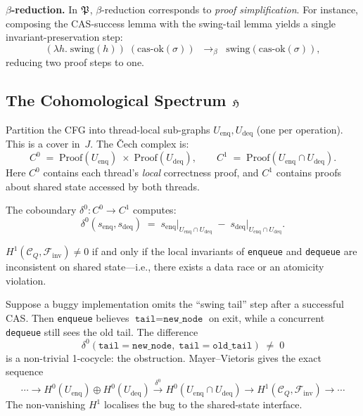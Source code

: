 \textbf{$\beta$-reduction.}\quad
In $\mathfrak{P}$, $\beta$-reduction corresponds to
\emph{proof simplification}.  For instance, composing the CAS-success
lemma with the swing-tail lemma yields a single invariant-preservation
step:
\[
  (\lambda h.\;\mathrm{swing}(h))\;(\mathrm{cas\text{-}ok}(\sigma))
  \;\;\longrightarrow_\beta\;\;
  \mathrm{swing}(\mathrm{cas\text{-}ok}(\sigma)),
\]
reducing two proof steps to one.

\subsection{The Cohomological Spectrum $\mathfrak{H}$}

\begin{construction}
\label{con:thread-cover}
Partition the CFG into thread-local sub-graphs
$U_{\mathrm{enq}},U_{\mathrm{deq}}$ (one per operation).  This is a
cover in~$J$.  The \v{C}ech complex is:
\[
  C^0 \;=\;
  \mathrm{Proof}(U_{\mathrm{enq}})
  \;\times\;
  \mathrm{Proof}(U_{\mathrm{deq}}),
  \qquad
  C^1 \;=\;
  \mathrm{Proof}(U_{\mathrm{enq}}\cap U_{\mathrm{deq}}).
\]
Here $C^0$ contains each thread's \emph{local} correctness proof,
and $C^1$ contains proofs about shared state accessed by both threads.
\end{construction}

The coboundary $\delta^0:C^0\to C^1$ computes:
\[
  \delta^0(s_{\mathrm{enq}},s_{\mathrm{deq}})
  \;=\;
  s_{\mathrm{enq}}\big|_{U_{\mathrm{enq}}\cap U_{\mathrm{deq}}}
  \;-\;
  s_{\mathrm{deq}}\big|_{U_{\mathrm{enq}}\cap U_{\mathrm{deq}}}.
\]

\begin{proposition}[Obstruction = data race]
\label{prop:race-obstruction}
$H^1(\mathcal{C}_Q,\mathcal{F}_{\mathrm{inv}})\neq 0$ if and only
if the local invariants of \texttt{enqueue} and \texttt{dequeue}
are inconsistent on shared state---i.e., there exists a data race
or an atomicity violation.
\end{proposition}

\begin{example}
Suppose a buggy implementation omits the ``swing tail'' step after
a successful CAS.  Then \texttt{enqueue} believes
$\texttt{tail}=\texttt{new\_node}$ on exit, while a concurrent
\texttt{dequeue} still sees the old tail.  The difference
\[
  \delta^0(\texttt{tail}=\texttt{new\_node},\;
           \texttt{tail}=\texttt{old\_tail})
  \;\neq\;0
\]
is a non-trivial 1-cocycle: the obstruction.
Mayer--Vietoris gives the exact sequence
\[
  \cdots\to
  H^0(U_{\mathrm{enq}})\oplus H^0(U_{\mathrm{deq}})
  \xrightarrow{\;\delta^0\;}
  H^0(U_{\mathrm{enq}}\cap U_{\mathrm{deq}})
  \to
  H^1(\mathcal{C}_Q,\mathcal{F}_{\mathrm{inv}})
  \to\cdots
\]
The non-vanishing $H^1$ localises the bug to the shared-state
interface.
\end{example}

